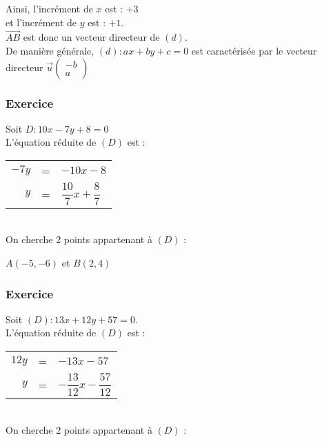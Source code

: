 Ainsi, l'incrément de $x$ est : $+ 3$ \\ 
et l'incrément de $y$ est : $ + 1$. \\

$\overrightarrow{AB}$ est donc un vecteur directeur de $(d)$. \\

De manière générale, $(d) : ax+by+c = 0$  est caractérisée par le vecteur directeur $\vec{u} 
                        \left(\begin{array}{c}
                              -b\\
                              a
                        \end{array}\right)$


\newpage

\subsubsection{Exercice }

Soit $D : 10x-7y+8 = 0$ \\

L'équation réduite de $(D)$ est : 

\begin{tabular}{r@{$\;$}c@{$\;$}l}
$-7y$ & = & $-10x-8 $\\
$y$ &  = & $ \dfrac{10}{7} x + \dfrac{8}{7} $ \\
\end{tabular}        \\

On cherche 2 points appartenant à $(D)$ :
        
$A(-5, -6)$ et
$B(2,4) $

\subsubsection{Exercice }

Soit $(D): 13x +12y+57 = 0$. \\

L'équation réduite de $(D)$ est : 

\begin{tabular}{r@{$\;$}c@{$\;$}l}
$12y$ &= & $-13x-57 $\\
$y$ & =& $ -\dfrac{13}{12}x-\dfrac{57}{12} $ \\
\end{tabular}        \\

On cherche 2 points appartenant à $(D)$ : 

